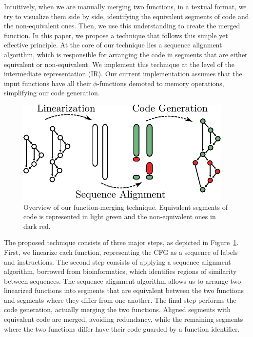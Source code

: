 \documentclass[10pt,twocolumn,nocopyrightspace]{sigplanconf}
\begin{document}
Intuitively, when we are manually merging two functions, in a textual format, we try to visualize them side by side, identifying the
equivalent segments of code and the non-equivalent ones. Then, we use this understanding to create the merged function. In this paper, we
propose a technique that follows this simple yet effective principle. At the core of our technique lies a sequence alignment algorithm,
which is responsible for arranging the code in segments that are either equivalent or non-equivalent.
We implement this technique at the level of the intermediate representation (IR).
Our current implementation assumes that the input functions have all their $\phi$-functions demoted to memory operations,
simplifying our code generation.

\begin{figure}[t!]
  \centering
  \includegraphics[width=0.85\linewidth]{figs/func-merge-overview.pdf}
  \caption{Overview of our function-merging technique.
           Equivalent segments of code is represented in light green and the non-equivalent ones in dark red.}
  \vspace{-1em}
  \label{fig:func-merge-overview}
\end{figure}

The proposed technique consists of three major steps, as depicted in
Figure~\ref{fig:func-merge-overview}.
First, we linearize each function, representing the CFG as a sequence of
labels and instructions.
The second step consists of applying a sequence alignment algorithm, borrowed
from bioinformatics, which identifies regions of similarity between sequences.
The sequence alignment algorithm allows us to arrange two linearized functions
into segments that are equivalent between the two functions and segments where
they differ from one another.
The final step performs the code generation, actually merging the two functions.
Aligned segments with equivalent code are merged, avoiding redundancy,
while the remaining segments where the two functions differ have their code
guarded by a function identifier.
\end{document}
